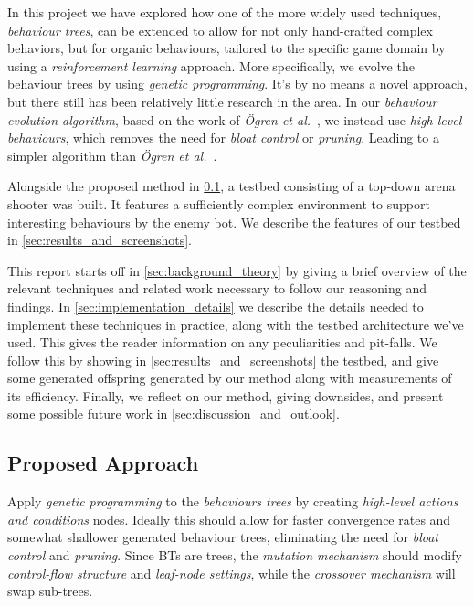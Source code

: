 \documentclass[a4paper, twocolumn]{article}
\begin{document}
    In this project we have explored how one of the more widely used techniques, \emph{behaviour trees}, can be extended to allow for not only hand-crafted complex behaviors, but for organic behaviours, tailored to the specific game domain by using a \emph{reinforcement learning} approach. More specifically, we evolve the behaviour trees by using \emph{genetic programming}. It's by no means a novel approach, but there still has been relatively little research in the area. In our \emph{behaviour evolution algorithm}, based on the work of \emph{{\"O}gren et al.}~\cite{colledanchise2015learning}, we instead use \emph{high-level behaviours}, which removes the need for \emph{bloat control} or \emph{pruning}. Leading to a simpler algorithm than \emph{{\"O}gren et al.}~\cite{colledanchise2015learning}.

    Alongside the proposed method in \cref{sec:proposed_approach}, a testbed consisting of a top-down arena shooter was built. It features a sufficiently complex environment to support interesting behaviours by the enemy bot. We describe the features of our testbed in \cref{sec:results_and_screenshots}.

    This report starts off in \cref{sec:background_theory} by giving a brief overview of the relevant techniques and related work necessary to follow our reasoning and findings. In \cref{sec:implementation_details} we describe the details needed to implement these techniques in practice, along with the testbed architecture we've used. This gives the reader information on any peculiarities and pit-falls. We follow this by showing in \cref{sec:results_and_screenshots} the testbed, and give some generated offspring generated by our method along with measurements of its efficiency. Finally, we reflect on our method, giving downsides, and present some possible future work in \cref{sec:discussion_and_outlook}.

    \subsection{Proposed Approach} \label{sec:proposed_approach}

    Apply \emph{genetic programming} to the \emph{behaviours trees} by creating \emph{high-level actions and conditions} nodes. Ideally this should allow for faster convergence rates and somewhat shallower generated behaviour trees, eliminating the need for \emph{bloat control} and \emph{pruning}. Since BTs are trees, the \emph{mutation mechanism} should modify \emph{control-flow structure} and \emph{leaf-node settings}, while the \emph{crossover mechanism} will swap sub-trees.
\end{document}

